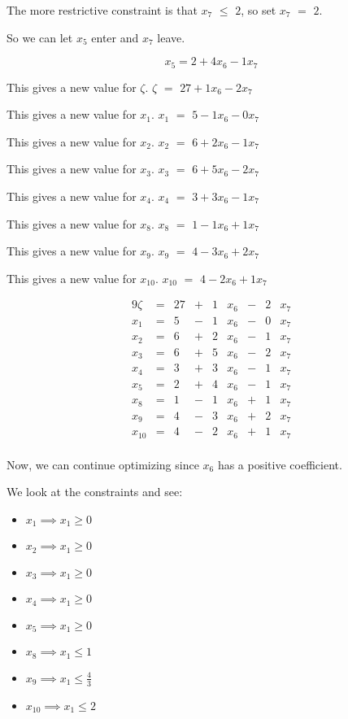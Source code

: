 \documentclass[12pt,letterpaper]{article}
\newcommand*\seeconstraints{
  We look at the constraints and see:
}
\newcommand*\continueopt[1]{
  Now, we can continue optimizing since #1 has a positive coefficient.
}
\newcommand*\enterleave[2]{
  So we can let #1 enter and #2 leave.
}
\newcommand*\morerestrictive[2]{
  The more restrictive constraint is that #1 $\leq$ #2, so set #1 $=$ #2.
}
\newcommand*\newvalue[2]{
  This gives a new value for #1. #1 $ = $ #2
}
\begin{document}
\begin{enumerate}
      \morerestrictive{$x_7$}{$2$}

      \enterleave{$x_5$}{$x_7$}

      \[
        x_5 = 2 + 4 x_6 - 1 x_7
      \]

      \newvalue{$\zeta$}{$27 + 1 x_6 - 2 x_7$}

      \newvalue{$x_1$}{$5  - 1 x_6 - 0 x_7$}

      \newvalue{$x_2$}{$6  + 2 x_6 - 1 x_7$}

      \newvalue{$x_3$}{$6  + 5 x_6 - 2 x_7$}

      \newvalue{$x_4$}{$3  + 3 x_6 - 1 x_7$}

      \newvalue{$x_8$}{$1  - 1 x_6 + 1 x_7$}

      \newvalue{$x_9$}{$4  - 3 x_6 + 2 x_7$}

      \newvalue{$x_{10}$}{$4 - 2 x_6 + 1 x_7$}

      \begin{alignat*}{9}
        \zeta  & {}={} & 27 & {}+{} & 1 & x_6 & {}-{} & 2 & x_7 \\
        x_1    & {}={} & 5  & {}-{} & 1 & x_6 & {}-{} & 0 & x_7 \\
        x_2    & {}={} & 6  & {}+{} & 2 & x_6 & {}-{} & 1 & x_7 \\
        x_3    & {}={} & 6  & {}+{} & 5 & x_6 & {}-{} & 2 & x_7 \\
        x_4    & {}={} & 3  & {}+{} & 3 & x_6 & {}-{} & 1 & x_7 \\
        x_5    & {}={} & 2  & {}+{} & 4 & x_6 & {}-{} & 1 & x_7 \\
        x_8    & {}={} & 1  & {}-{} & 1 & x_6 & {}+{} & 1 & x_7 \\
        x_9    & {}={} & 4  & {}-{} & 3 & x_6 & {}+{} & 2 & x_7 \\
        x_{10} & {}={} & 4  & {}-{} & 2 & x_6 & {}+{} & 1 & x_7 \\
      \end{alignat*}

      \continueopt{$x_6$}

      \seeconstraints

      \begin{itemize}
        \item $x_1    \implies x_1 \geq 0$
        \item $x_2    \implies x_1 \geq 0$
        \item $x_3    \implies x_1 \geq 0$
        \item $x_4    \implies x_1 \geq 0$
        \item $x_5    \implies x_1 \geq 0$
        \item $x_8    \implies x_1 \leq 1$
        \item $x_9    \implies x_1 \leq \frac{4}{3}$
        \item $x_{10} \implies x_1 \leq 2$
      \end{itemize}


\end{enumerate}
\end{document}
